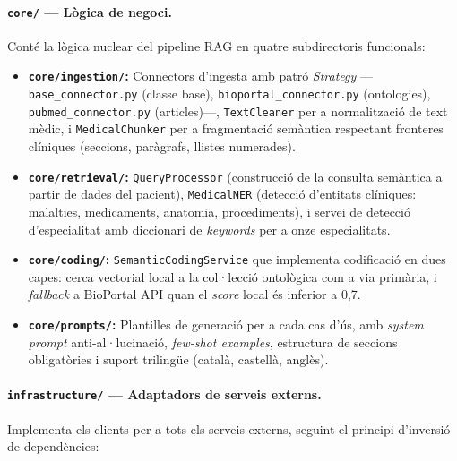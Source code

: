 \documentclass[CAT]{TFUOC}%
\begin{document}
\paragraph{\texttt{core/} --- Lògica de negoci.}
Conté la lògica nuclear del pipeline RAG en quatre subdirectoris funcionals:

\begin{itemize}
    \item \textbf{\texttt{core/ingestion/}:} Connectors d'ingesta amb patró \textit{Strategy} ---\texttt{base\_connector.py} (classe base), \texttt{bioportal\_connector.py} (ontologies), \texttt{pubmed\_connector.py} (articles)---, \texttt{TextCleaner} per a normalització de text mèdic, i \texttt{MedicalChunker} per a fragmentació semàntica respectant fronteres clíniques (seccions, paràgrafs, llistes numerades).

    \item \textbf{\texttt{core/retrieval/}:} \texttt{QueryProcessor} (construcció de la consulta semàntica a partir de dades del pacient), \texttt{MedicalNER} (detecció d'entitats clíniques: malalties, medicaments, anatomia, procediments), i servei de detecció d'especialitat amb diccionari de \textit{keywords} per a onze especialitats.

    \item \textbf{\texttt{core/coding/}:} \texttt{SemanticCodingService} que implementa codificació en dues capes: cerca vectorial local a la col·lecció ontològica com a via primària, i \textit{fallback} a BioPortal API quan el \textit{score} local és inferior a 0,7.

    \item \textbf{\texttt{core/prompts/}:} Plantilles de generació per a cada cas d'ús, amb \textit{system prompt} anti-al·lucinació, \textit{few-shot examples}, estructura de seccions obligatòries i suport trilingüe (català, castellà, anglès).
\end{itemize}

\paragraph{\texttt{infrastructure/} --- Adaptadors de serveis externs.}
Implementa els clients per a tots els serveis externs, seguint el principi d'inversió de dependències:
\end{document}
